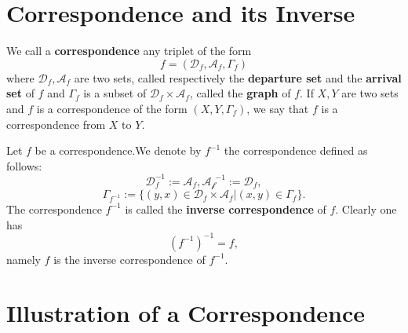\documentclass{book}
\numberwithin{equation}{section}
\begin{document}
\section{Correspondence and its Inverse}
\begin{definitionenv}
    We call a \textbf{correspondence} any triplet of the form $$f=(\mathscr{D} _f, \mathscr{A}_f, \Gamma_f)$$
    where $\mathscr{D}_f, \mathscr{A}_f$ are two sets,  called respectively the \textbf{departure set }  and the \textbf{arrival set} of $f$ and $\Gamma_f$ is a subset of $\mathscr{D}_f\times \mathscr{A}_f$,  called the \textbf{graph} of $f$.
    \newline
    If $X, Y$ are two sets and $f$ is a correspondence of the form $(X, Y, \Gamma_f)$, we say that $f$ is a correspondence from $X$ to $Y$. 
\end{definitionenv}
\begin{definitionenv}
    Let $f$ be a correspondence.We denote by $f^{-1}$ the correspondence defined as follows:
    $$\mathscr{D}_f^{-1}:=\mathscr{A}_f, \mathscr{A_f}^{-1}:=\mathscr{D}_f, $$
    $$\Gamma_{f^{-1}}:=\{(y, x)\in \mathscr{D}_f\times \mathscr{A}_f|(x, y)\in \Gamma_f\}.$$
    The correspondence $f^{-1}$ is called the \textbf{inverse correspondence} of $f$. Clearly one has $$(f^{-1})^{-1}=f, $$
    namely $f$ is the inverse correspondence of $f^{-1}$.
\end{definitionenv}
\section{Illustration of a Correspondence}
\end{document}
